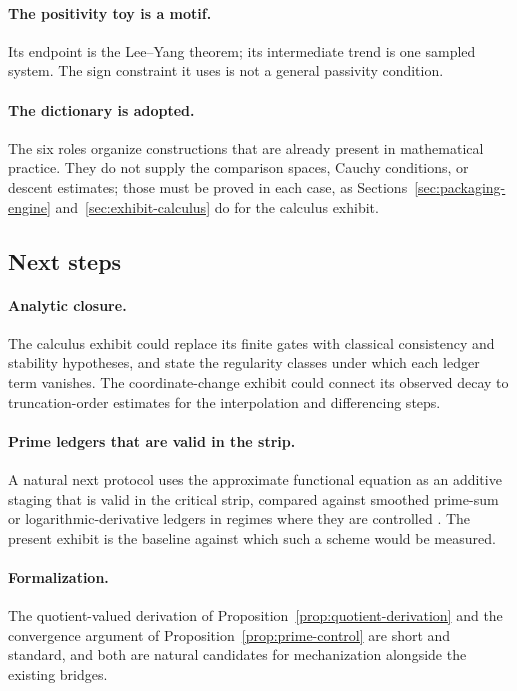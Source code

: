 \paragraph{The positivity toy is a motif.}
Its endpoint is the Lee--Yang theorem; its intermediate trend is one sampled system.
The sign constraint it uses is not a general passivity condition.

\paragraph{The dictionary is adopted.}
The six roles organize constructions that are already present in mathematical practice.
They do not supply the comparison spaces, Cauchy conditions, or descent estimates; those must be proved in each case, as Sections~\ref{sec:packaging-engine} and~\ref{sec:exhibit-calculus} do for the calculus exhibit.

\subsection{Next steps}
\paragraph{Analytic closure.}
The calculus exhibit could replace its finite gates with classical consistency and stability hypotheses, and state the regularity classes under which each ledger term vanishes.
The coordinate-change exhibit could connect its observed decay to truncation-order estimates for the interpolation and differencing steps.

\paragraph{Prime ledgers that are valid in the strip.}
A natural next protocol uses the approximate functional equation as an additive staging that is valid in the critical strip, compared against smoothed prime-sum or logarithmic-derivative ledgers in regimes where they are controlled \cite{Titchmarsh1986}.
The present exhibit is the baseline against which such a scheme would be measured.

\paragraph{Formalization.}
The quotient-valued derivation of Proposition~\ref{prop:quotient-derivation} and the convergence argument of Proposition~\ref{prop:prime-control} are short and standard, and both are natural candidates for mechanization alongside the existing bridges.

